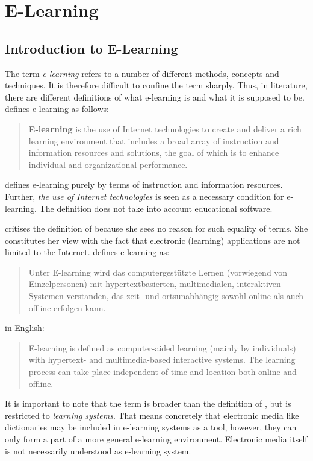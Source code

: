 \chapter{E-Learning}
\label{chap:elearning}

\section{Introduction to E-Learning}
\label{sec:elearn:intro}

The term \emph{e-learning} refers to a number of different methods, concepts
and techniques. It is therefore difficult to confine the term sharply.
Thus, in literature, there are different definitions of what e-learning is
and what it is supposed to be.
 \citeyear{Rosenberg2006} defines e-learning as
follows:
  \begin{quote}
    \textbf{E-learning} is the use of Internet technologies to create and
    deliver a rich learning environment that includes a broad array of 
    instruction and information resources and solutions, the goal of which
    is to enhance individual and organizational performance.
  \end{quote}
 defines e-learning purely by terms of instruction
and information resources. Further, \emph{the use of Internet technologies} 
is seen as a necessary condition for e-learning. The definition does not 
take into account educational software.

 \citeyear{Richert2007} critises the definition of
 because she sees no reason for such equality
of terms. She constitutes her view with the fact that electronic (learning) 
applications are not limited to the Internet.  
\citeyear{Richert2007} defines e-learning as:
  \begin{quote}
    Unter E-learning wird das computergestützte Lernen (vorwiegend von 
    Einzelpersonen) mit hypertextbasierten, multimedialen, interaktiven 
    Systemen verstanden, das zeit- und ortsunabhängig sowohl online als 
    auch offline erfolgen kann.
  \end{quote}
in English:
  \begin{quote}
    E-learning is defined as computer-aided learning (mainly by individuals)
    with hypertext- and multimedia-based interactive systems. The learning
    process can take place independent of time and location both online and 
    offline.
  \end{quote}
It is important to note that the term is broader than the definition of
, but is restricted to \emph{learning systems}.
That means concretely that electronic media like dictionaries may be included
in e-learning systems as a tool, however, they can only form a part of a 
more general e-learning environment. Electronic media itself is not necessarily
understood as e-learning system.

